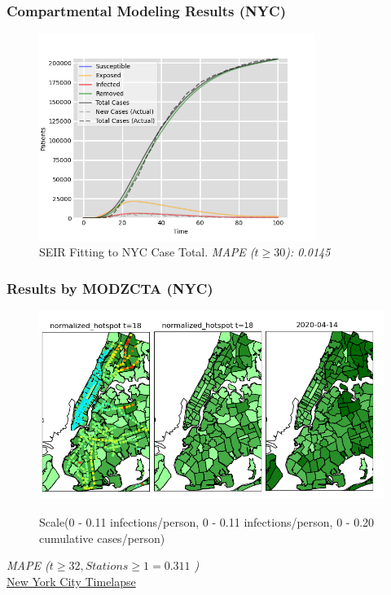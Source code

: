 \documentclass{beamer}
\begin{document}
\begin{frame}
\frametitle{Compartmental Modeling Results (NYC)}
\begin{figure}
\includegraphics[width=0.8\textwidth]{Scratch_Visuals/SEIR_Curve_NYC_3.png}
\caption{SEIR Fitting to NYC Case Total. \textit{MAPE ($t \geq 30$): 0.0145}}
\end{figure}
\end{frame}
\begin{frame}
\frametitle{Results by MODZCTA (NYC)}
\begin{figure}[htbp]
\includegraphics[width=1.0\textwidth]{Scratch_Visuals/NYC_Geo_Fitting.png}
\begin{tiny}
Scale(0 - 0.11 infections/person, 0 - 0.11 infections/person, 0 - 0.20 cumulative cases/person) 
\end{tiny}
\end{figure}
\textit{MAPE ($t \geq 32, Stations \geq 1 = 0.311$ )}\\
\href{https://github.com/cheung-ho-lum/NS_Epidemics_ABM_Approach/blob/master/Repository/Visualizations/infection_timelapse_NYC_3.gif}{New York City Timelapse}
\end{frame}
\end{document}
